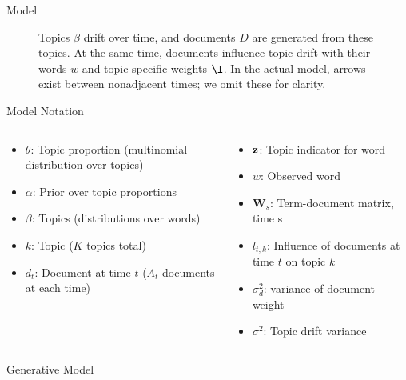 \documentclass[final,t]{beamer}
\newcommand{\z}{\bold{z}}
\newcommand{\W}{\textbf{W}}
\begin{document}
\begin{frame}{}
\begin{columns}[t]
\begin{column}{.29\linewidth}
\begin{block}{Model}
\begin{figure}
\caption{\small Topics $\beta$ drift over time, and documents $D$ are
generated from these topics.  At the same time, documents influence
topic drift with their words $w$ and topic-specific weights $\l$.  In
the actual model, arrows exist between nonadjacent times; we omit these for
clarity. \normalsize}
\end{figure}
\end{block}
\begin{block}{Model Notation}
\vspace{-2cm}
\small
     \begin{columns}
     \begin{column}{.45\linewidth}
     \begin{itemize}
       \item $\theta$: Topic proportion (multinomial distribution over topics)
        \item $\alpha$: Prior over topic proportions
        \item $\beta$: Topics (distributions over words)
        \item $k$: Topic ($K$ topics total)
        \item $d_t$: Document at time $t$ ($A_t$ documents at each time)
\end{itemize}
\end{column}
\begin{column}{.40\linewidth}
\begin{itemize}
        \item $\z$: Topic indicator for word
        \item $w$: Observed word
	\item $\W_s$: Term-document matrix, time s
        \item $l_{t,k}$: Influence of documents at time $t$ on topic $k$
        \item $\sigma_d^2$: variance of document weight
	\item $\sigma^2$: Topic drift variance
    \end{itemize}
\end{column}
\end{columns}
\normalsize


\end{block}

\begin{block}{Generative Model}
\vspace{-.9cm}


\end{block}
\end{column}
\end{columns}
\end{frame}
\end{document}
